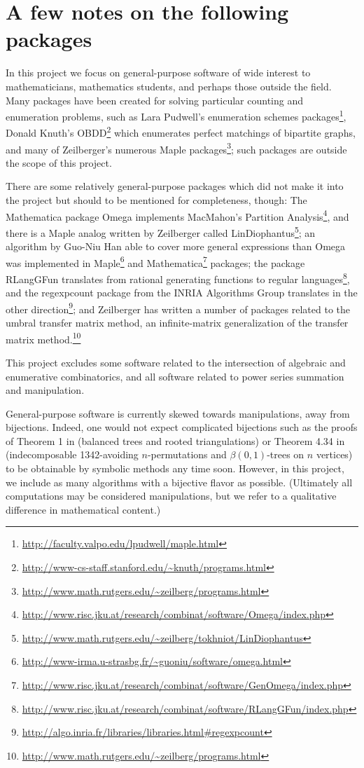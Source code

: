 \documentclass[12pt]{article}
\theoremstyle{plain}
\begin{document}
\section{A few notes on the following packages}
\label{sec:notes}
In this project we focus on general-purpose software of wide interest to mathematicians, mathematics students, and perhaps those outside the field.
Many packages have been created for solving particular counting and enumeration problems, such as Lara Pudwell's enumeration schemes packages\footnote{
 \url{http://faculty.valpo.edu/lpudwell/maple.html}
}, Donald Knuth's OBDD\footnote{
 \url{http://www-cs-staff.stanford.edu/~knuth/programs.html}
} which enumerates perfect matchings of bipartite graphs, and many of Zeilberger's numerous Maple packages\footnote{
 \url{http://www.math.rutgers.edu/~zeilberg/programs.html}
};
such packages are outside the scope of this project.

There are some relatively general-purpose packages which did not make it into the project but should to be mentioned for completeness, though:
The Mathematica package Omega implements MacMahon's Partition Analysis\footnote{
 \url{http://www.risc.jku.at/research/combinat/software/Omega/index.php}
},
and there is a Maple analog written by Zeilberger called LinDiophantus\footnote{
 \url{http://www.math.rutgers.edu/~zeilberg/tokhniot/LinDiophantus}
};
an algorithm by Guo-Niu Han able to cover more general expressions than Omega was implemented in Maple\footnote{
 \url{http://www-irma.u-strasbg.fr/~guoniu/software/omega.html}
} and Mathematica\footnote{
 \url{http://www.risc.jku.at/research/combinat/software/GenOmega/index.php}
} packages;
the package RLangGFun translates from rational generating functions to regular languages\footnote{
 \url{http://www.risc.jku.at/research/combinat/software/RLangGFun/index.php}
},
and the regexpcount package from the INRIA Algorithms Group translates in the other direction\footnote{
 \url{http://algo.inria.fr/libraries/libraries.html\#regexpcount}
};
and Zeilberger has written a number of packages related to the umbral transfer matrix method, an infinite-matrix generalization of the transfer matrix method.\footnote{
 \url{http://www.math.rutgers.edu/~zeilberg/programs.html}
}

This project excludes some software related to the intersection of algebraic and enumerative combinatorics, and all software related to
power series summation and manipulation.

General-purpose software is currently skewed towards manipulations, away from bijections.
Indeed, one would not expect complicated bijections such as the proofs of
Theorem 1 in \cite{triangles} (balanced trees and rooted triangulations)
or
Theorem 4.34 in \cite{erratabook} (indecomposable 1342-avoiding \(n\)-permutations and \( \beta(0,1) \)-trees on \(n\) vertices)
to be obtainable by symbolic methods any time soon.
However, in this project, we include as many algorithms with a bijective flavor as possible.
(Ultimately all computations may be considered manipulations, but we refer to a qualitative difference in mathematical content.)
\end{document}
